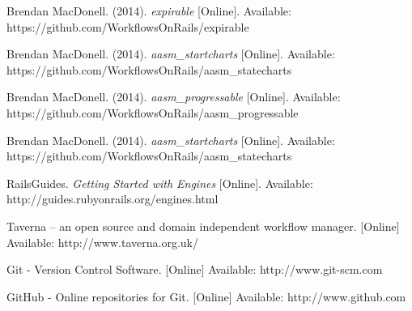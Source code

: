 \begin{thebibliography}{99}
Brendan MacDonell. (2014). \textit{expirable} [Online]. Available: https://github.com/WorkflowsOnRails/expirable

Brendan MacDonell. (2014). \textit{aasm\_startcharts} [Online]. Available: https://github.com/WorkflowsOnRails/aasm\_statecharts

Brendan MacDonell. (2014). \textit{aasm\_progressable} [Online]. Available: https://github.com/WorkflowsOnRails/aasm\_progressable

Brendan MacDonell. (2014). \textit{aasm\_startcharts} [Online]. Available: https://github.com/WorkflowsOnRails/aasm\_statecharts

RailsGuides. \textit{Getting Started with Engines} [Online]. Available: http://guides.rubyonrails.org/engines.html

Taverna -- an open source and domain independent workflow manager. [Online] Available: http://www.taverna.org.uk/

Git - Version Control Software. [Online] Available: http://www.git-scm.com

GitHub - Online repositories for Git. [Online] Available: http://www.github.com

\end{thebibliography}

%    
%    

